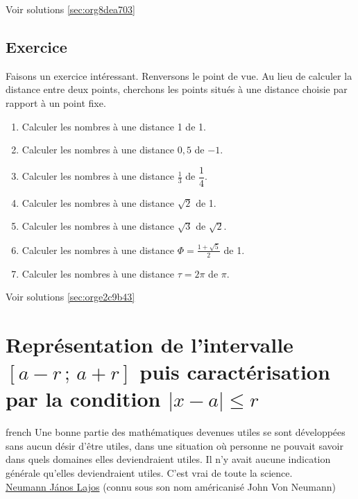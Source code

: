 \documentclass[a4paper, 11pt, twoside]{book}
\newcommand{\ceintr}[2]{\left[#1\,;\,#2\right]}
\newcommand{\disk}[3]{\left\lvert #1 - #2 \right\rvert \leq #3}
\begin{document}
Voir solutions \ref{sec:org8dea703}

\section{Exercice}
\label{sec:orgf3fa79d}
Faisons un exercice intéressant. Renversons le point de vue. Au
lieu de calculer la distance entre deux points, cherchons les
points situés à une distance choisie par rapport à un point fixe.

\begin{enumerate}
\item Calculer les nombres à une distance 1 de 1.
\item Calculer les nombres à une distance \(0,5\) de \(-1\).
\item Calculer les nombres à une distance \(\frac{1}{3}\) de
\(\dfrac{1}{4}\).
\item Calculer les nombres à une distance \(\sqrt{2}\) de 1.
\item Calculer les nombres à une distance \(\sqrt{3}\) de \(\sqrt{2}\).
\item Calculer les nombres à une distance \(\Phi = \frac{1 +
       \sqrt{5}}{2}\) de 1.
\item Calculer les nombres à une distance \(\tau = 2\pi\) de \(\pi\).
\end{enumerate}


Voir solutions \ref{sec:orge2c9b43}
\stopcontents[level-2]

\chapter{Représentation de l'intervalle \(\ceintr{a - r}{a + r}\) puis caractérisation par la condition \(\disk{x}{a}{r}\)}
\label{sec:orga6d284e}
\startcontents[level-2]

\begin{foreigndisplayquote}{french}
Une bonne partie des mathématiques devenues utiles se sont
développées sans aucun désir d'être utiles, dans une situation où
personne ne pouvait savoir dans quels domaines elles deviendraient
utiles. Il n'y avait aucune indication générale qu'elles
deviendraient utiles. C'est vrai de toute la science.\\

\href{https://fr.wikipedia.org/wiki/John\_von\_Neumann}{Neumann János Lajos} (connu sous son nom américanisé John Von Neumann)
\end{foreigndisplayquote}
\end{document}

